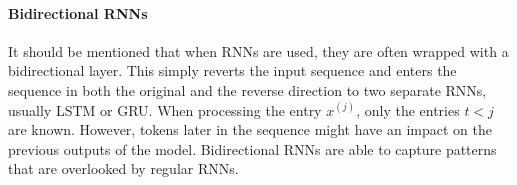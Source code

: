         \paragraph{Bidirectional RNNs} It should be mentioned that when RNNs are used, they are often wrapped with a bidirectional layer.
        This simply reverts the input sequence and enters the sequence in both the original and the reverse direction to two separate RNNs, usually LSTM or GRU.
        When processing the entry $x^{(j)}$, only the entries $t < j$ are known. 
        However, tokens later in the sequence might have an impact on the previous outputs of the model. 
        Bidirectional RNNs are able to capture patterns that are overlooked by regular RNNs.
